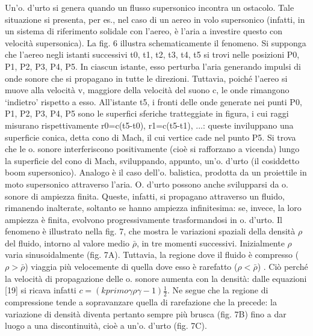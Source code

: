\documentclass[a4paper]{article}
\begin{document}
Un'o. d'urto si genera quando un flusso supersonico incontra un ostacolo. Tale situazione si presenta, per es., nel caso di un aereo in volo supersonico (infatti, in un sistema di riferimento solidale con l'aereo, è l'aria a investire questo con velocità supersonica). La fig. 6 illustra schematicamente il fenomeno. Si supponga che l'aereo negli istanti successivi t0, t1, t2, t3, t4, t5 si trovi nelle posizioni P0, P1, P2, P3, P4, P5. In ciascun istante, esso perturba l'aria generando impulsi di onde sonore che si propagano in tutte le direzioni. Tuttavia, poiché l'aereo si muove alla velocità v, maggiore della velocità del suono c, le onde rimangono ‘indietro' rispetto a esso. All'istante t5, i fronti delle onde generate nei punti P0, P1, P2, P3, P4, P5 sono le superfici sferiche tratteggiate in figura, i cui raggi misurano rispettivamente r0=c(t5-t0), r1=c(t5-t1), ...: queste inviluppano una superficie conica, detta cono di Mach, il cui vertice cade nel punto P5. Si trova che le o. sonore interferiscono positivamente (cioè si rafforzano a vicenda) lungo la superficie del cono di Mach, sviluppando, appunto, un'o. d'urto (il cosiddetto boom supersonico). 
Analogo è il caso dell'o. balistica, prodotta da un proiettile in moto supersonico attraverso l'aria. O. d'urto possono anche svilupparsi da o. sonore di ampiezza finita. 
Queste, infatti, si propagano attraverso un fluido, rimanendo inalterate, soltanto se hanno ampiezza infinitesima: se, invece, la loro ampiezza è finita, evolvono progressivamente trasformandosi in o. d'urto. Il fenomeno è illustrato nella fig. 7, che mostra le variazioni spaziali della densità $\rho$ del fluido, intorno al valore medio $\bar{\rho}$, in tre momenti successivi. 
Inizialmente $\rho$ varia sinusoidalmente (fig. 7A). Tuttavia, la regione dove il fluido è compresso ($\rho>\bar{\rho}$) viaggia più velocemente di quella dove esso è rarefatto ($\rho<\bar{\rho}$) . 
Ciò perché la velocità di propagazione delle o. sonore aumenta con la densità: dalle equazioni [19] si ricava infatti 
$c=(k primo \gamma\rho \gamma-1)\frac{1}{2}$. 
Ne segue che la regione di compressione tende a sopravanzare quella di rarefazione che la precede: la variazione di densità diventa pertanto sempre più brusca (fig. 7B) fino a dar luogo a una discontinuità, cioè a un'o. d'urto (fig. 7C). 
\end{document}
